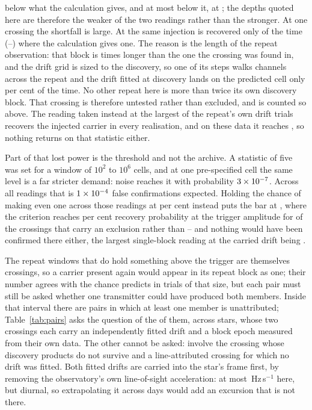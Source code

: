 \HjDevMed{} below what the calculation gives, and at most \HjDevMaxOther{}
below it, at \HjDevStarOther; the depths quoted here are therefore the weaker
of the two readings rather than the stronger. At one crossing the shortfall
is large. At \HjEtaStar{} the same injection is recovered only
\HjEtaMeas{} of the time (\HjEtaLo--\HjEtaHi) where the calculation gives
one. The reason is the length of the repeat observation: that block is
\HjEtaLenRatio{} times longer than the one the crossing was found in, and
the drift grid is sized to the discovery, so one of its steps walks
\HjEtaWalkCh{} channels across the repeat and the drift fitted at discovery
lands on the predicted cell only \HjEtaFracOkPct{} per cent of the time. No
other repeat here is more than twice its own discovery block. That crossing is therefore untested rather than excluded,
and is counted so above. The reading taken instead at the largest of the
repeat's own drift trials recovers the injected carrier in every realisation,
and on these data it reaches \HjEtaMaxReal, so nothing returns on that
statistic either.

Part of that lost power is the threshold and not the archive. A statistic
of five was set for a window of $10^{2}$ to $10^{6}$ cells, and at one
pre-specified cell the same level is a far stricter demand: noise reaches it with probability
$3\times10^{-7}$. Across all \RcNRepeatMeas{} readings
that is $1\times10^{-4}$ false confirmations
expected. Holding the chance of making even one across
those readings at \ZtFwPct{} per cent instead puts the bar at \ZtTrialThr,
where the criterion reaches \RcPowerLevel{} per cent recovery probability at
the trigger amplitude for \HjNPowerTrial{} of the crossings that carry an
exclusion rather than \HjNPowerHi{} -- and nothing would have been confirmed
there either, the largest single-block reading at the carried drift being
\RcTMatched.

The \WdNExc{} repeat windows that do hold something above the trigger are
themselves crossings, so a carrier present again would appear in its repeat
block as one; their number agrees with the \WdExpect{} chance predicts in
trials of that size, but each pair must still be asked whether one transmitter
could have produced both members. Inside that interval there are
\TjNCandPair{} pairs in which at least
one member is unattributed; Table~\ref{tab:pairs} asks the question of the
\TjNPair{} of them, across \TjNStarPair{} stars, whose two crossings each
carry an independently fitted drift and a block epoch measured from their own
data. The other \TjNCandLost{} cannot be asked: \TjNCandLostSpec{} involve the
crossing whose discovery products do not survive and \TjNCandLostFit{} a
line-attributed crossing for which no drift was fitted. Both fitted drifts are
carried into the star's frame first, by removing the observatory's own
line-of-sight acceleration: at most \TjFrameMaxHzS\,Hz\,s$^{-1}$ here, but
diurnal, so extrapolating it across days would add an excursion that is not
there.


